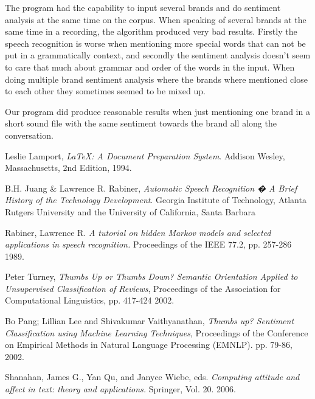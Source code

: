 \documentclass[a4paper,12pt,twoside]{ltxdoc}
\begin{document}
The program had the capability to input several brands and do sentiment analysis at the same time on the corpus. When speaking of several brands at the same time in a recording, the algorithm produced very bad results. Firstly the speech recognition is worse when mentioning more special words that can not be put in a grammatically context, and secondly the sentiment analysis doesn't seem to care that much about grammar and order of the words in the input. When doing multiple brand sentiment analysis where the brands where mentioned close to each other they sometimes seemed to be mixed up. 

Our program did produce reasonable results when just mentioning one brand in a short sound file with the same sentiment towards the brand all along the conversation. 

\newpage 

\begin{thebibliography}{9}

  Leslie Lamport,
  \emph{\LaTeX: A Document Preparation System}.
  Addison Wesley, Massachusetts,
  2nd Edition,
  1994.
  
  B.H. Juang \& Lawrence R. Rabiner,
  \emph{Automatic Speech Recognition � A Brief History of the Technology Development}.
  Georgia Institute of Technology, Atlanta
  Rutgers University and the University of California, Santa Barbara
  
Rabiner, Lawrence R.
\emph{A tutorial on hidden Markov models and selected applications in speech recognition.}
Proceedings of the IEEE 77.2,
pp. 257-286
1989.

Peter Turney, 
\emph{Thumbs Up or Thumbs Down? Semantic Orientation Applied to Unsupervised Classification of Reviews},
 Proceedings of the Association for Computational Linguistics,
 pp. 417-424
 2002.

  Bo Pang; Lillian Lee and Shivakumar Vaithyanathan,
  \emph{Thumbs up? Sentiment Classification using Machine Learning Techniques},
  Proceedings of the Conference on Empirical Methods in Natural Language Processing (EMNLP).
  pp. 79-86,
  2002.

  Shanahan, James G., Yan Qu, and Janyce Wiebe, eds.
  \emph{Computing attitude and affect in text: theory and applications.}
  Springer, 
  Vol. 20.
  2006.

\end{thebibliography}
\end{document}
